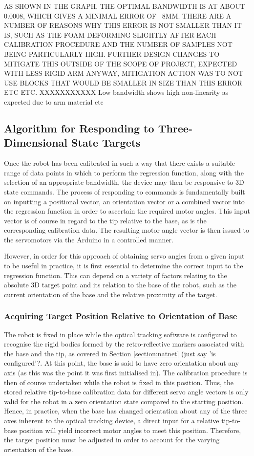 \documentclass[11pt]{article}
\begin{document}
AS SHOWN IN THE GRAPH, THE OPTIMAL BANDWIDTH IS AT ABOUT 0.0008, WHICH GIVES A MINIMAL ERROR OF ~8MM. THERE ARE A NUMBER OF REASONS WHY THIS ERROR IS NOT SMALLER THAN IT IS, SUCH AS THE FOAM DEFORMING SLIGHTLY AFTER EACH CALIBRATION PROCEDURE AND THE NUMBER OF SAMPLES NOT BEING PARTICULARLY HIGH. FURTHER DESIGN CHANGES TO MITIGATE THIS OUTSIDE OF THE SCOPE OF PROJECT, EXPECTED WITH LESS RIGID ARM ANYWAY, MITIGATION ACTION WAS TO NOT USE BLOCKS THAT WOULD BE SMALLER IN SIZE THAN THIS ERROR ETC ETC. XXXXXXXXXXX
Low bandwidth shows high non-linearity as expected due to arm material etc




\pagebreak 
\subsection{Algorithm for Responding to Three-Dimensional State Targets}
Once the robot has been calibrated in such a way that there exists a suitable range of data points in which to perform the regression function, along with the selection of an appropriate bandwidth, the device may then be responsive to 3D state commands.
The process of responding to commands is fundamentally built on inputting a positional vector, an orientation vector or a combined vector into the regression function in order to ascertain the required motor angles. This input vector is of course in regard to the tip relative to the base, as is the corresponding calibration data. The resulting motor angle vector is then issued to the servomotors via the Arduino in a controlled manner. 

However, in order for this approach of obtaining servo angles from a given input to be useful in practice, it is first essential to determine the correct input to the regression function. This can depend on a variety of factors relating to the absolute 3D target point and its relation to the base of the robot, such as the current orientation of the base and the relative proximity of the target.

\subsubsection{Acquiring Target Position Relative to Orientation of Base}
The robot is fixed in place while the optical tracking software is configured to recognise the rigid bodies formed by the retro-reflective markers associated with the base and the tip, as covered in Section \ref{section:natnet} (just say 'is configured'?. At this point, the base is said to have zero orientation about any axis (as this was the point it was first initialised in). The calibration procedure is then of course undertaken while the robot is fixed in this position. Thus, the stored relative tip-to-base calibration data for different servo angle vectors is only valid for the robot in a zero orientation state compared to the starting position. Hence, in practice, when the base has changed orientation about any of the three axes inherent to the optical tracking device, a direct input for a relative tip-to-base position will yield incorrect motor angles to meet this position. Therefore, the target position must be adjusted in order to account for the varying orientation of the base.
\end{document}

